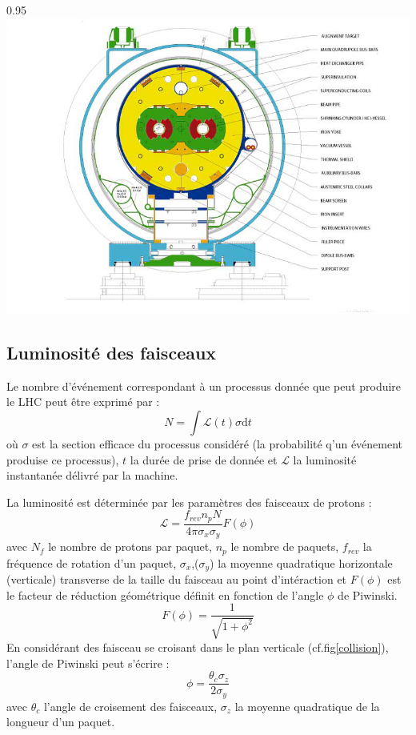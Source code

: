 \begin{minipagewithmarginpars}[h]{0.95\textwidth}
\centering
\includegraphics[width=1.0\textwidth]{LHC/dipole.jpg}
\label{dipole}	
\end{minipagewithmarginpars}

\subsection{Luminosité des faisceaux}
Le nombre d'événement correspondant à un processus donnée que peut produire le LHC peut être exprimé par :
\begin{equation}
N=\int \mathcal{L}(t)\sigma \mathrm dt
\end{equation}
où $\sigma$ est la section efficace du processus considéré (la probabilité q'un événement produise ce processus), $t$ la durée de prise de donnée et $\mathcal{L}$ la luminosité instantanée délivré par la machine.

La luminosité est déterminée par les paramètres des faisceaux de protons :
\begin{equation}
\mathcal{L}=\frac{f_{rev}n_{p}N_{}}{4\pi \sigma_{x} \sigma_{y}} F(\phi)
\end{equation}
avec $N_{f}$ le nombre de protons par paquet, $n_{p}$ le nombre de paquets, $f_{rev}$ la fréquence de rotation d'un paquet, $\sigma_{x}$,($\sigma_{y}$) la moyenne quadratique horizontale (verticale) transverse de la taille du faisceau au point d'intéraction et $F(\phi)$ est le facteur de réduction géométrique définit en fonction de l'angle $\phi$ de Piwinski.
\begin{equation}
F(\phi)=\frac{1}{\sqrt{1+\phi^{2}}}
\end{equation}
En considérant des faisceau se croisant dans le plan verticale (cf.fig\ref{collision}), l'angle de Piwinski peut s'écrire :
\begin{equation}
\phi=\frac{\theta_{c}\sigma_{z}}{2\sigma_{y}}
\end{equation}
avec $\theta_{c}$ l'angle de croisement des faisceaux, $\sigma_{z}$ la moyenne quadratique de la longueur d'un paquet.


